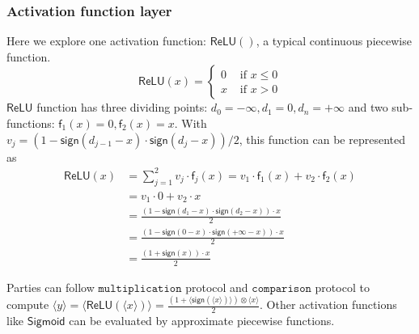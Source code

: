 \documentclass[letterpaper]{article} %
\begin{document}
    \subsubsection{Activation function layer}
    Here we explore one  activation function: $\mathsf{ReLU}()$, a typical continuous piecewise function.
    $$\mathsf{ReLU}(x)=\begin{cases}
        0 & \text{ if } x \leqslant 0  \\
        x & \text{ if } x > 0
        \end{cases}$$
    $\mathsf{ReLU}$ function has three dividing points: $d_{0}= -\infty ,d_{1}= 0, d_{n}=+\infty$ and two sub-functions:
    $\mathsf{f}_{1}(x)= 0 ,\mathsf{f}_{2}(x)= x$.
    With $v_{j} = (1-\mathsf{sign}(d_{j-1}-x)\cdot \mathsf{sign}(d_{j}-x))/2$, this function can be represented as
    \begin{align*}
        \mathsf{ReLU}(x)&=\sum_{j=1}^{2}v_{j}\cdot \mathsf{f}_{j}(x)=v_{1}\cdot \mathsf{f}_{1}(x)+v_{2}\cdot \mathsf{f}_{2}(x)\\
        &=v_{1}\cdot 0 +v_{2}\cdot x\\
        &=\frac{(1-\mathsf{sign}(d_{1}-x)\cdot \mathsf{sign}(d_{2}-x))\cdot x}{2} \\
        &=\frac{(1-\mathsf{sign}(0-x)\cdot \mathsf{sign}(+\infty -x))\cdot x}{2} \\
        &=\frac{(1+\mathsf{sign}(x))\cdot x}{2}
    \end{align*}

    Parties can follow $\mathtt{multiplication}$ protocol and $\mathtt{comparison}$ protocol to compute
    $\langle y\rangle=\langle \mathsf{ReLU}(\langle x\rangle)\rangle=\frac{(1+\langle \mathsf{sign}(\langle x\rangle)\rangle)\otimes \langle x\rangle}{2}$.
    Other activation functions like $\mathsf{Sigmoid}$ can be evaluated by
    approximate piecewise functions.



\end{document}
